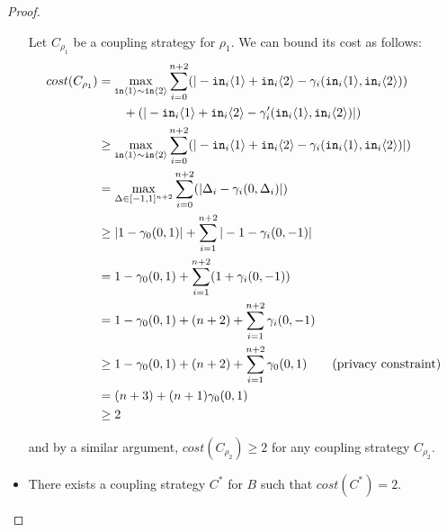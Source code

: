 \begin{proof}
\begin{itemize}
        Let $C_{\rho_1}$ be a coupling strategy for $\rho_1$. We can bound its cost as follows: 
        \begin{align*}
            cost(C_{\rho_1}) &= \max_{\texttt{in}\langle1 \rangle\sim\texttt{in}\langle2 \rangle}\sum_{i=0}^{n+2}(|-\texttt{in}_i\langle1 \rangle+\texttt{in}_i\langle2 \rangle-\gamma_i(\texttt{in}_i\langle1 \rangle, \texttt{in}_i\langle2 \rangle))\\&\qquad+(|-\texttt{in}_i\langle1 \rangle+\texttt{in}_i\langle2 \rangle-\gamma_i'(\texttt{in}_i\langle1 \rangle, \texttt{in}_i\langle2 \rangle)|)\\
            &\geq \max_{\texttt{in}\langle1 \rangle\sim\texttt{in}\langle2 \rangle} \sum_{i=0}^{n+2}(|-\texttt{in}_i\langle1 \rangle+\texttt{in}_i\langle2 \rangle-\gamma_i(\texttt{in}_i\langle1 \rangle, \texttt{in}_i\langle2 \rangle)|)\\
            &= \max_{\Delta \in [-1, 1]^{n+2}} \sum_{i=0}^{n+2}(|\Delta_i-\gamma_i(0, \Delta_i)|)\\
            &\geq |1 - \gamma_0(0, 1)| + \sum_{i=1}^{n+2}|-1-\gamma_i(0, -1)|\\
            &= 1 - \gamma_0(0, 1) + \sum_{i=1}^{n+2} (1+\gamma_i(0, -1))\\
            &= 1 - \gamma_0(0, 1) + (n + 2) + \sum_{i=1}^{n+2}\gamma_i(0, -1)\\
            &\geq 1 - \gamma_0(0, 1) + (n + 2) + \sum_{i=1}^{n+2}\gamma_0(0, 1) \qquad \text{(privacy constraint)}\\
            &= (n + 3) + (n + 1) \gamma_0(0, 1)\\
            &\geq 2
        \end{align*}

    and by a similar argument, $cost(C_{\rho_2})\geq 2$ for any coupling strategy $C_{\rho_2}$.

    \item There exists a coupling strategy $C^*$ for $B$ such that $cost(C^*) = 2$.
    

\end{itemize}
\end{proof}
